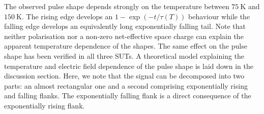 The observed pulse shape depends strongly on the temperature between $\SI{75}{\kelvin}$ and $\SI{150}{\kelvin}$. 
The rising edge develops an $1-\exp \left(-t/\tau(T)\right)$ behaviour while the falling edge develops an equivalently long exponentially falling tail. 
Note that neither polarisation nor a non-zero net-effective space charge can explain the apparent temperature dependence of the shapes. 
The same effect on the pulse shape has been verified in all three SUTs.
A theoretical model explaining the temperature and electric field dependence of the pulse shape is laid down in the discussion section.
Here, we note that the signal can be decomposed into two parts: an almost rectangular one and a second comprising exponentially rising and falling flanks. 
The exponentially falling flank is a direct consequence of the exponentially rising flank. 





